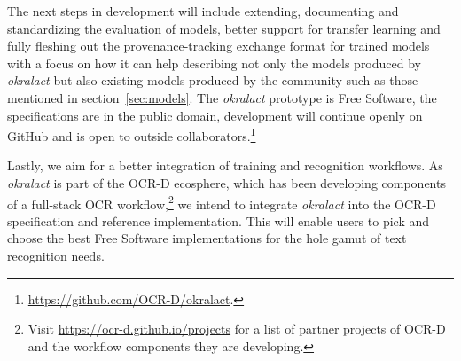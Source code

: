 \documentclass[sigconf]{acmart}
\begin{document}
The next steps in development will include extending, documenting and standardizing
the evaluation of models, better support for transfer learning \cite{027.7169} and fully fleshing
out the provenance-tracking exchange format for trained models with a focus on
how it can help describing not only the models produced by \textit{okralact} but
also existing models produced by the community such as those mentioned in
section~\ref{sec:models}. The \textit{okralact} prototype is Free Software, the
specifications are in the public domain, development will continue openly on
GitHub and is open to outside collaborators.\footnote{\url{https://github.com/OCR-D/okralact}.}







Lastly, we aim for a better integration of training and
recognition workflows. As \textit{okralact} is part of the OCR-D
ecosphere, which has been developing components of a full-stack
OCR workflow,\footnote{Visit \url{https://ocr-d.github.io/projects} for a list of partner projects of OCR-D and the workflow components they are developing.} 
we intend to integrate \textit{okralact} into the
OCR-D specification and reference implementation. This will enable
users to pick and choose the best Free Software implementations for
the hole gamut of text recognition needs.



\end{document}
